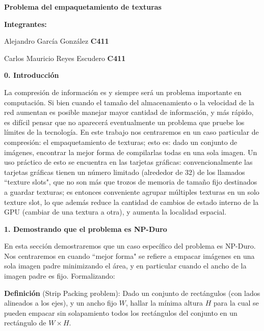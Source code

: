 \documentclass{article}
\begin{document}
\renewcommand{\figurename}{Figura}

\center
\textbf{Problema del empaquetamiento de texturas}

\bigskip

\textbf{Integrantes:} 

Alejandro García González \quad \textbf{C411} 

Carlos Mauricio Reyes Escudero \quad \textbf{C411}

\bigskip
\bigskip

\textbf{0. Introducción}

\raggedright

La compresión de información es y siempre será un problema importante en computación. Si bien cuando el tamaño del almacenamiento o la velocidad de la red aumentan es posible manejar mayor cantidad de información, y más rápido, es difícil pensar que no aparecerá eventualmente un problema que pruebe los límites de la tecnología. En este trabajo nos centraremos en un caso particular de compresión: el empaquetamiento de texturas; esto es: dado un conjunto de imágenes, encontrar la mejor forma de compilarlas todas en una sola imagen. Un uso práctico de esto se encuentra en las tarjetas gráficas: convencionalmente las tarjetas gráficas tienen un número limitado (alrededor de 32) de los llamados ``texture slots", que no son más que trozos de memoria de tamaño fijo destinados a guardar texturas; es entonces conveniente agrupar múltiples texturas en un solo texture slot, lo que además reduce la cantidad de cambios de estado interno de la GPU (cambiar de una textura a otra), y aumenta la localidad espacial.

\bigskip

\center
\textbf{1. Demostrando que el problema es NP-Duro}

\raggedright
\smallskip

En esta sección demostraremos que un caso específico del problema es NP-Duro. Nos centraremos en cuando ``mejor forma" se refiere a empacar imágenes en una sola imagen padre minimizando el área, y en particular cuando el ancho de la imagen padre es fijo. Formalizando: 

\bigskip

\textbf{Definición} (Strip Packing problem): Dado un conjunto de rectángulos (con lados alineados a los ejes), y un ancho fijo $W$, hallar la mínima altura $H$ para la cual se pueden empacar sin solapamiento todos los rectángulos del conjunto en un rectángulo de $W \times H$.

\bigskip
\end{document}
